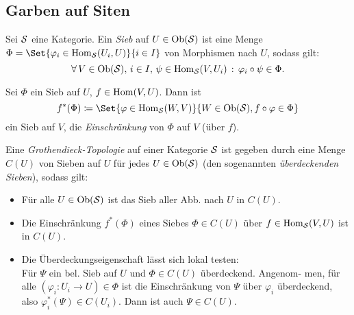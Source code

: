 \documentclass{cheat-sheet}
\begin{document}



\begin{samepage}

\subsection{Garben auf Siten}

\end{samepage}

\begin{defn}
  Sei $\mathcal{S}$ eine Kategorie. Ein \emph{Sieb} auf $U \in \operatorname{Ob}(\mathcal{S})$ ist eine Menge $\Phi = \Set{\varphi_i \in \Hom_\Sit(U_i, U)}{i \in I}$ von Morphismen nach $U$, sodass gilt:
  \[ \forall \, {V \in \operatorname{Ob}(\mathcal{S}), \, i \in I, \, \psi \in \operatorname{Hom}_{\mathcal{S}}(V, U_i)} \,:\, \varphi_i \circ \psi \in \Phi. \]
\end{defn}

\begin{bem}
  Sei $\Phi$ ein Sieb auf $U$, $f \in \operatorname{Hom}(V, U)$. Dann ist
  \[ f^*(\Phi) \coloneqq \Set{\varphi \in \Hom_\Sit(W, V)}{W \in \Ob(\Sit), f \circ \varphi \in \Phi} \]
  ein Sieb auf $V$, die \emph{Einschränkung} von $\Phi$ auf $V$ (über $f$).
\end{bem}

\begin{defn}
  Eine \emph{Grothendieck-Topologie} auf einer Kategorie $\mathcal{S}$ ist gegeben durch eine Menge $C(U)$ von Sieben auf $U$ für jedes $U \in \operatorname{Ob}(\mathcal{S})$ (den sogenannten \emph{überdeckenden Sieben}), sodass gilt:
  \begin{itemize}
    \item Für alle $U \in \operatorname{Ob}(\mathcal{S})$ ist das Sieb aller Abb. nach $U$ in $C(U)$.
    \item Die Einschränkung $f^*(\Phi)$ eines Siebes $\Phi \in C(U)$ über $f \in \operatorname{Hom}_{\mathcal{S}}(V, U)$ ist in $C(U)$.
    \item Die Überdeckungseigenschaft lässt sich lokal testen: \\
    Für $\Psi$ ein bel. Sieb auf $U$ und $\Phi \in C(U)$ überdeckend. Angenom- men, für alle $(\varphi_i : U_i \to U) \in \Phi$ ist die Einschränkung von $\Psi$ über $\varphi_i$ überdeckend, also $\varphi_i^*(\Psi) \in C(U_i)$. Dann ist auch $\Psi \in C(U)$.
  \end{itemize}
\end{defn}
\end{document}
